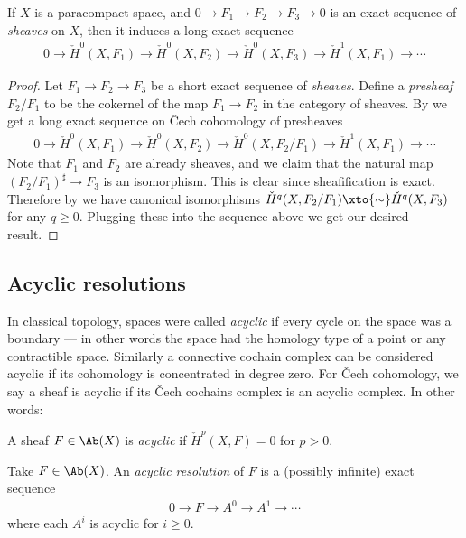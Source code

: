 \documentclass[11pt]{amsart}
\begin{document}
\begin{proposition}\label{prop:LES-Cech-cohomology}
If $X$ is a paracompact space, and $0 \to F_1 \to F_2 \to F_3 \to 0$ is an exact sequence of \emph{sheaves} on $X$, then it induces a long exact sequence
\begin{align*}
    0 \to \check{H}^0(X,F_1) \to \check{H}^0(X,F_2) \to \check{H}^0(X,F_3) \to \check{H}^1(X,F_1) \to \cdots
\end{align*}
\end{proposition}
\begin{proof} Let $F_1 \to F_2 \to F_3$ be a short exact sequence of \emph{sheaves}. Define a \emph{presheaf} $F_2/F_1$ to be the cokernel of the map $F_1 \to F_2$ in the category of sheaves. By  we get a long exact sequence on \v{C}ech cohomology of presheaves
\begin{align*}
    0 \to \check{H}^0(X,F_1) \to \check{H}^0(X,F_2) \to \check{H}^0(X, F_2/F_1) \to \check{H}^1(X,F_1) \to \cdots 
\end{align*}
Note that $F_1$ and $F_2$ are already sheaves, and we claim that the natural map $(F_2/F_1)^\sharp \to F_3$ is an isomorphism. This is clear since sheafification is exact. Therefore by  we have canonical isomorphisms $\check{H}^q(X,F_2/F_1) \xto{\sim} \check{H}^q(X,F_3)$ for any $q\ge0$. Plugging these into the sequence above we get our desired result.
\end{proof}

\subsection{Acyclic resolutions}

In classical topology, spaces were called \emph{acyclic} if every cycle on the space was a boundary --- in other words the space had the homology type of a point or any contractible space. Similarly a connective cochain complex can be considered acyclic if its cohomology is concentrated in degree zero. For \v{C}ech cohomology, we say a sheaf is acyclic if its \v{C}ech cochains complex is an acyclic complex. In other words:

\begin{definition}\label{def:acyclic-sheaf} A sheaf $F\in \Ab(X)$ is \emph{acyclic} if $\check{H}^p(X,F) = 0$ for $p>0$.
\end{definition}

\begin{definition} Take $F\in \Ab(X)$. An \emph{acyclic resolution} of $F$ is a (possibly infinite) exact sequence
\begin{align*}
    0 \to F \to A^0 \to A^1 \to \cdots
\end{align*}
where each $A^i$ is acyclic for $i\ge 0$.
\end{definition}
\end{document}
